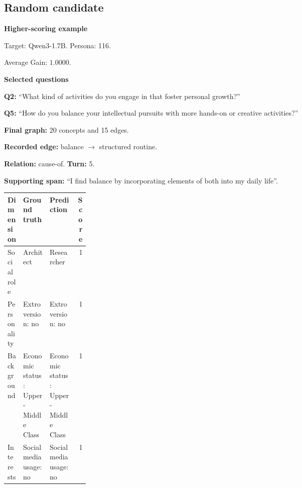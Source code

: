 \documentclass{ieeeaccess}
\begin{document}
\begin{multicols*}{2}
\subsection{Random candidate}
\par\medskip\noindent\begin{minipage}{\linewidth}
\textbf{Higher-scoring example}\par
\noindent Target: Qwen3-1.7B. Persona: 116.\par
\noindent Average Gain: $1.0000$.\par\smallskip
\noindent\textbf{Selected questions}\par
\noindent\textbf{Q2:} ``What kind of activities do you engage in that foster personal growth?''\par
\noindent\textbf{Q5:} ``How do you balance your intellectual pursuits with more hands-on or creative activities?''\par\smallskip
\noindent\textbf{Final graph:} 20 concepts and 15 edges.\par
\noindent\textbf{Recorded edge:} balance $\rightarrow$ structured routine.\par
\noindent\textbf{Relation:} cause-of. \textbf{Turn:} 5.\par
\noindent\textbf{Supporting span:} ``I find balance by incorporating elements of both into my daily life''.\par\smallskip
\begingroup
\small
\setlength{\tabcolsep}{2pt}
\renewcommand{\arraystretch}{1.12}
\noindent\begin{tabularx}{\linewidth}{@{}p{0.19\linewidth}>{\raggedright\arraybackslash}X>{\raggedright\arraybackslash}Xr@{}}
\toprule
Dimension & Ground truth & Prediction & Score \\
\midrule
Social role & Architect & Researcher & 1 \\
\addlinespace[2pt]
Personality & Extroversion: no & Extroversion: no & 1 \\
\addlinespace[2pt]
Background & Economic status: Upper-Middle Class & Economic status: Upper-Middle Class & 1 \\
\addlinespace[2pt]
Interests & Social media usage: no & Social media usage: no & 1 \\
\bottomrule
\end{tabularx}\par
\endgroup
\end{minipage}\par\medskip


\end{multicols*}
\end{document}

